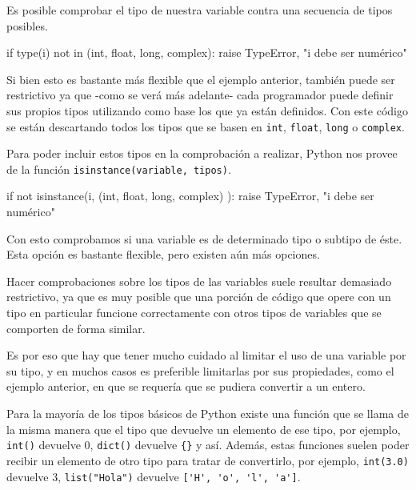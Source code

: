 Es posible comprobar el tipo de nuestra variable contra una secuencia de
tipos posibles.

\begin{codigo-python-sn}
if type(i) not in (int, float, long, complex):
	raise TypeError, "i debe ser numérico"
\end{codigo-python-sn}

Si bien esto es bastante más flexible que el ejemplo anterior, también puede
ser restrictivo ya que -como se verá más adelante- cada programador puede
definir sus propios tipos utilizando como base los que ya están definidos.
Con este código se están descartando todos los tipos que se basen en
\lstinline!int!, \lstinline!float!,
\lstinline!long! o \lstinline!complex!.

Para poder incluir estos tipos en la comprobación a realizar, Python nos
provee de la función \lstinline!isinstance(variable, tipos)!.

\begin{codigo-python-sn}
if not isinstance(i, (int, float, long, complex) ):
	raise TypeError, "i debe ser numérico"
\end{codigo-python-sn}

Con esto comprobamos si una variable es de determinado tipo o subtipo de
éste. Esta opción es bastante flexible, pero existen aún más opciones.

\begin{atencion}
Hacer comprobaciones sobre los tipos de las variables suele resultar
demasiado restrictivo, ya que es muy posible que una porción de código que
opere con un tipo en particular funcione correctamente con otros tipos de
variables que se comporten de forma similar.

Es por eso que hay que tener mucho cuidado al limitar el uso de una
variable por su tipo, y en muchos casos es preferible limitarlas por sus
propiedades, como el ejemplo anterior, en que se requería que se pudiera
convertir a un entero.
\end{atencion}

Para la mayoría de los tipos básicos de Python existe una función que se
llama de la misma manera que el tipo que devuelve un elemento de ese tipo,
por ejemplo, \lstinline!int()! devuelve 0, \lstinline!dict()! devuelve
\lstinline!{}! y así. Además, estas funciones suelen poder recibir un
elemento de otro tipo para tratar de convertirlo, por ejemplo,
\lstinline!int(3.0)! devuelve 3, \lstinline!list("Hola")! devuelve
\lstinline!['H', 'o', 'l', 'a']!.

